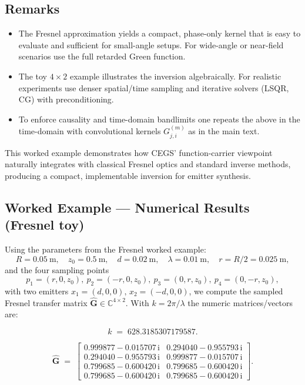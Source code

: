 \documentclass[11pt]{article}
\theoremstyle{plain}
\theoremstyle{definition}
\theoremstyle{remark}
\begin{document}
\subsection*{Remarks}
\begin{itemize}[leftmargin=*]
  \item The Fresnel approximation yields a compact, phase-only kernel that is easy to
        evaluate and sufficient for small-angle setups. For wide-angle or near-field
        scenarios use the full retarded Green function.
  \item The toy \(4\times 2\) example illustrates the inversion algebraically.
        For realistic experiments use denser spatial/time sampling and iterative
        solvers (LSQR, CG) with preconditioning.
  \item To enforce causality and time-domain bandlimits one repeats the above in
        the time-domain with convolutional kernels \(G_{j,i}^{(m)}\) as in the main text.
\end{itemize}

\noindent This worked example demonstrates how CEGS' function-carrier viewpoint
naturally integrates with classical Fresnel optics and standard inverse methods,
producing a compact, implementable inversion for emitter synthesis.

\subsection*{Worked Example — Numerical Results (Fresnel toy)}
Using the parameters from the Fresnel worked example:
\[
R=0.05\ \text{m},\quad z_0=0.5\ \text{m},\quad d=0.02\ \text{m},\quad \lambda=0.01\ \text{m},
\quad r=R/2=0.025\ \text{m},
\]
and the four sampling points
\[
p_1=(r,0,z_0),\ p_2=(-r,0,z_0),\ p_3=(0,r,z_0),\ p_4=(0,-r,z_0),
\]
with two emitters \(x_1=(d,0,0),\,x_2=(-d,0,0)\), we compute the sampled
Fresnel transfer matrix \(\hat{\mathbf{G}}\in\mathbb{C}^{4\times 2}\).
With \(k=2\pi/\lambda\) the numeric matrices/vectors are:

\[
k \;=\; 628.3185307179587.
\]

\[
\hat{\mathbf{G}} \;=\;
\begin{bmatrix}
0.999877 - 0.015707\,\mathrm{i} & 0.294040 - 0.955793\,\mathrm{i} \\
0.294040 - 0.955793\,\mathrm{i} & 0.999877 - 0.015707\,\mathrm{i} \\
0.799685 - 0.600420\,\mathrm{i} & 0.799685 - 0.600420\,\mathrm{i} \\
0.799685 - 0.600420\,\mathrm{i} & 0.799685 - 0.600420\,\mathrm{i}
\end{bmatrix}.
\]
\end{document}
